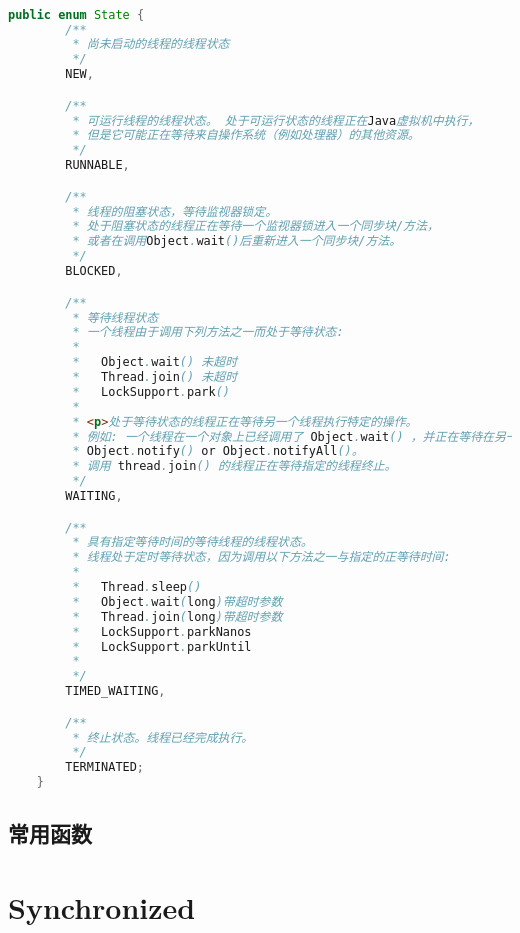 \begin{lstlisting}[language=java]

public enum State {
        /**
         * 尚未启动的线程的线程状态
         */
        NEW,

        /**
         * 可运行线程的线程状态。 处于可运行状态的线程正在Java虚拟机中执行，
         * 但是它可能正在等待来自操作系统（例如处理器）的其他资源。
         */
        RUNNABLE,

        /**
         * 线程的阻塞状态，等待监视器锁定。
         * 处于阻塞状态的线程正在等待一个监视器锁进入一个同步块/方法，
         * 或者在调用Object.wait()后重新进入一个同步块/方法。
         */
        BLOCKED,

        /**
         * 等待线程状态
         * 一个线程由于调用下列方法之一而处于等待状态:
         * 
         *   Object.wait() 未超时
         *   Thread.join() 未超时
         *   LockSupport.park()
         * 
         * <p>处于等待状态的线程正在等待另一个线程执行特定的操作。
         * 例如: 一个线程在一个对象上已经调用了 Object.wait() ，并正在等待在另一个线程在另一对象上调用
         * Object.notify() or Object.notifyAll()。
         * 调用 thread.join() 的线程正在等待指定的线程终止。
         */
        WAITING,

        /**
         * 具有指定等待时间的等待线程的线程状态。
         * 线程处于定时等待状态，因为调用以下方法之一与指定的正等待时间:
         * 
         *   Thread.sleep()
         *   Object.wait(long)带超时参数
         *   Thread.join(long)带超时参数
         *   LockSupport.parkNanos
         *   LockSupport.parkUntil
         * 
         */
        TIMED_WAITING,

        /**
         * 终止状态。线程已经完成执行。
         */
        TERMINATED;
    }

\end{lstlisting}

\subsection{常用函数}




\section{Synchronized}



